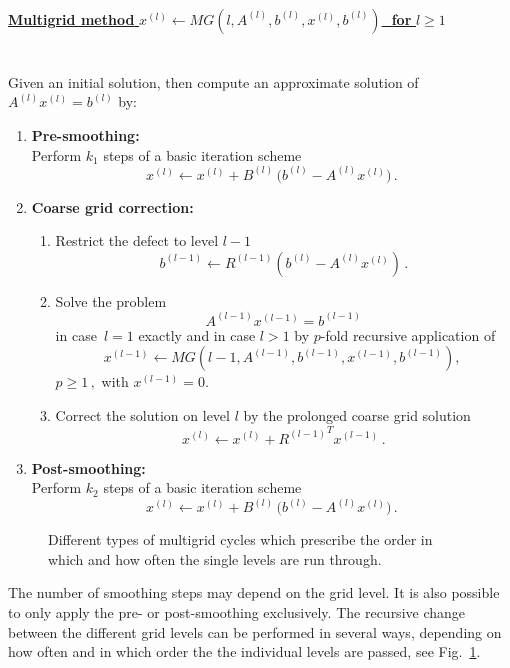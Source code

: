 \paragraph{\underline{{\bf Multigrid method}\,\,{\boldmath $x^{(l)} \leftarrow MG(l,A^{(l)},b^{(l)},x^{(l)},b^{(l)})$}\,\, for\,\,{\boldmath $l\geq 1$}}} \mbox{} \\[1ex]
Given an initial solution, then compute an approximate solution of $A^{(l)} x^{(l)} =b^{(l)}$ by:
\begin{enumerate}
%
\item {\bf Pre-smoothing:} \\ [1ex]
Perform $k_1$ steps of a basic iteration scheme
\[ x^{(l)} \leftarrow x^{(l)} + B^{(l)}\, \big(b^{(l)} - A^{(l)} x^{(l)} \big)\,. \]
\item {\bf Coarse grid correction:}
%
\begin{enumerate}
\item Restrict the defect to level $l-1$
\[ b^{(l-1)} \leftarrow R^{(l-1)} (b^{(l)} - A^{(l)} x^{(l)} )\,. \]
\item Solve the problem
\[ A^{(l-1)} x^{(l-1)} = b^{(l-1)} \]
in case $\,l=1$ exactly and in case  $l>1$ by $p$-fold recursive application of
\[ x^{(l-1)}  \leftarrow MG(l-1,A^{(l-1)}, b^{(l-1)}, x^{(l-1)}, b^{(l-1)}),\,\]
$p \geq 1\,,$  with $x^{(l-1)}=0$.
\item Correct the solution on level $l$ by the prolonged coarse grid solution
\[ x^{(l)} \leftarrow x^{(l)} + {R^{(l-1)}}^T x^{(l-1)} \,.\]
\end{enumerate}
%
\item {\bf Post-smoothing:} \\[1ex]
Perform $k_2$ steps of a basic iteration scheme
\[ x^{(l)} \leftarrow x^{(l)} + B^{(l)}\, \big(b^{(l)} - A^{(l)} x^{(l)} \big)\,. \]
%
\end{enumerate}

\begin{figure}[htbp]
\begin{center}

\end{center}
\caption{Different types of multigrid cycles which prescribe the order in which and how often the single levels are run through.}
\label{FIG_SCARC_mg_cycle}
\end{figure}

\newpage  %
The number of smoothing steps may depend on the grid level. It is also possible to only apply the pre- or post-smoothing exclusively.
The recursive change between the different grid levels can be performed in several ways, depending on how
often and in which order the the individual levels are passed, see Fig.~\ref {FIG_SCARC_mg_cycle}.


